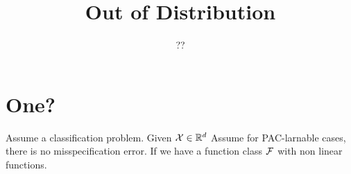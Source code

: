 \documentclass[11pt,fullpage]{article}
\begin{document}
\title{Out of Distribution}
\author{??}
\maketitle

\section{One?}
Assume a classification problem. Given ${\mathcal{X}}\in {{\mathbb{R}}}^d $
Assume for PAC-larnable cases, there is no misspecification error. If we have a function class ${\mathcal{F}}$ with non linear functions.



\end{document}

